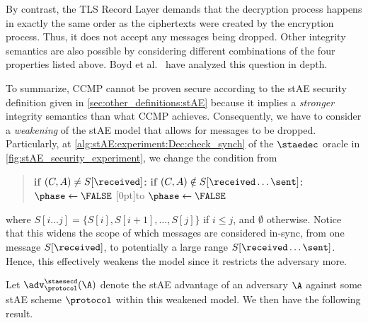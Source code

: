 


By contrast,
the TLS Record Layer demands that the decryption process happens in exactly the same order as the ciphertexts were created by the encryption process.
Thus,
it does not accept any messages being dropped.
Other integrity semantics are also possible by considering different combinations of the four properties listed above.
Boyd et al.~\cite{RSA:BHMS16} have analyzed this question in depth.
 

To summarize,
CCMP cannot be proven secure according to the stAE security definition given in \cref{sec:other_definitions:stAE} because it implies a \emph{stronger} integrity semantics than what CCMP achieves.
Consequently,
we have to consider a \emph{weakening} of the stAE model that allows for messages to be dropped.
Particularly,
at  \cref{alg:stAE:experiment:Dec:check_synch} of the $\staedec$ oracle in \cref{fig:stAE_security_experiment},
we change the condition  from
\begin{quote}
	\textbf{if} $(C,A) \neq S[\received]$\textbf{:}  \hspace*{1cm} \phantom{to} \hspace*{1cm}	\textbf{if} $(C,A) \notin S[\received \dotso \sent]$\textbf{:}
	\hspace*{\algorithmicindent} $\phase \gets \FALSE$ \hspace*{1cm} \raisebox{0.5\baselineskip}[0pt]{to} \hspace*{1cm}	\hspace*{\algorithmicindent} $\phase \gets \FALSE$
\end{quote}
where $S[i \dotso j] = \lbrace S[i], S[i+1], \dotsc, S[j] \rbrace$ if $i \leq j$,
and $\emptyset$ otherwise.
Notice that this widens the scope of which messages are considered in-sync,
from one message $S[\received]$,
to potentially a large range $S[\received \dotso \sent]$.
Hence, this effectively weakens the model since it restricts the adversary more. 


Let $\adv_{\protocol}^{\staesecd}(\A)$ denote the stAE advantage of an adversary $\A$ against some stAE scheme $\protocol$ within this weakened model.
We then have the following result.


